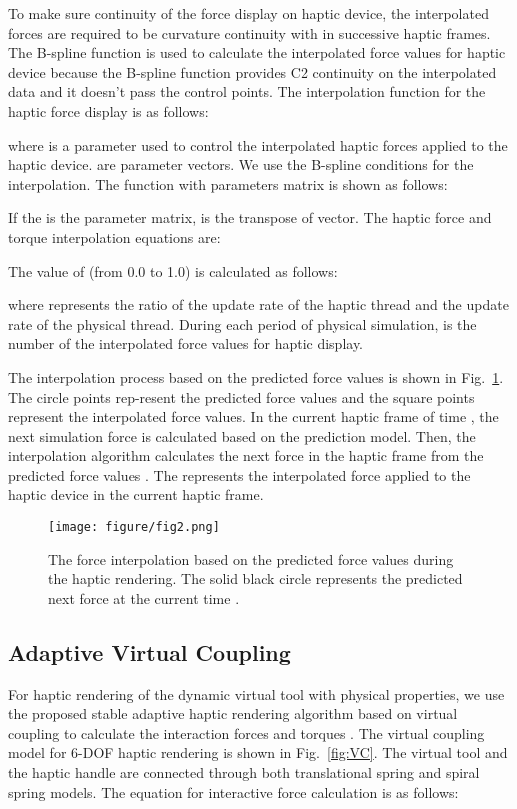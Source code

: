 \documentclass[10pt,journal,cspaper,compsoc]{IEEEtran}
\begin{document}
To make sure continuity of the force display on haptic device, the interpolated forces are required to be curvature continuity with in successive haptic frames. The B-spline function is used to calculate the interpolated force values for haptic device because the B-spline function provides C2 continuity on the interpolated data and it doesn't pass the control points.  The interpolation function for the haptic force display is as follows:

where  is a parameter used to control the interpolated haptic forces applied to the haptic device.  are parameter vectors. We use the B-spline conditions for the interpolation. The function with parameters matrix is shown as follows:



If the   is the parameter matrix,  is the transpose of  vector. The haptic force and torque interpolation equations are:


The value of  (from 0.0 to 1.0) is calculated as follows:

where   represents the ratio of the update rate of the haptic thread and the update rate of the physical thread. During each period of physical simulation,   is the number of the interpolated force values for haptic display. 

The interpolation process based on the predicted force values is shown in Fig.~\ref{fig:predict}. The circle points rep-resent the predicted force values and the square points represent the interpolated force values. In the current haptic frame of time , the next simulation force  is calculated based on the prediction model. Then, the interpolation algorithm calculates the next force in the haptic frame from the predicted force values . The  represents the interpolated force applied to the haptic device in the current haptic frame.
\begin{figure}[!t]
	\centering
	\texttt{[image: figure/fig2.png]}
	\caption{The force interpolation based on the predicted force values during the haptic rendering. The solid black circle  represents the predicted next force at the current time . }
	\label{fig:predict}
\end{figure}

\subsection{Adaptive Virtual Coupling}
For haptic rendering of the dynamic virtual tool with physical properties, we use the proposed stable adaptive haptic rendering algorithm based on virtual coupling to calculate the interaction forces and torques \cite{no19}. The virtual coupling model for 6-DOF haptic rendering is shown in Fig.~\ref{fig:VC}. The virtual tool and the haptic handle are connected through both translational spring and spiral spring models. The equation for interactive force calculation is as follows: 
\end{document}
